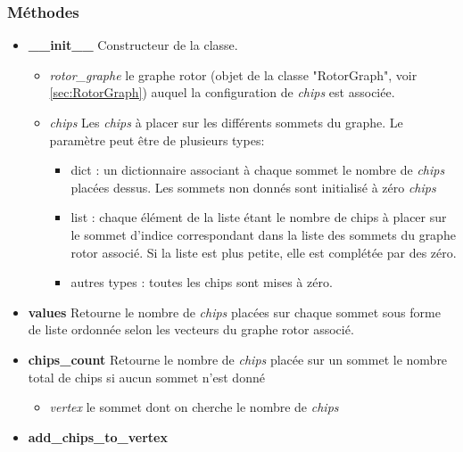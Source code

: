 \documentclass{article}
\begin{document}
			\subsubsection{Méthodes} 
				\begin{itemize}
					\item \textbf{\_\_init\_\_}\newline
					Constructeur de la classe.
					\begin{itemize}
						\item \textit{rotor\_graphe}\newline
						le graphe rotor (objet de la classe "RotorGraph", voir \ref{sec:RotorGraph}) auquel la configuration de \textit{chips} est associée.
						\item \textit{chips}\newline
						Les \textit{chips} à placer sur les différents sommets du graphe. Le paramètre peut être de plusieurs types:
						\begin{itemize}
							\item dict : un dictionnaire associant à chaque sommet le nombre de \textit{chips} placées dessus. Les sommets non donnés sont initialisé à zéro \textit{chips}
							\item list : chaque élément de la liste étant le nombre de chips à placer sur le sommet d'indice correspondant dans la liste des sommets du graphe rotor associé. Si la liste est plus petite, elle est complétée par des zéro.
							\item autres types : toutes les chips sont mises à zéro.
						\end{itemize}
					\end{itemize}
					\item \textbf{values}\newline
					Retourne le nombre de \textit{chips} placées sur chaque sommet sous forme de liste ordonnée selon les vecteurs du graphe rotor associé.
					\item \textbf{chips\_count}\newline
					Retourne le nombre de \textit{chips} placée sur un sommet le nombre total de chips si aucun sommet n'est donné
					\begin{itemize}
						\item \textit{vertex}\newline
						le sommet dont on cherche le nombre de \textit{chips}
					\end{itemize}
					\item \textbf{add\_chips\_to\_vertex}\newline

\end{itemize}
\end{document}
